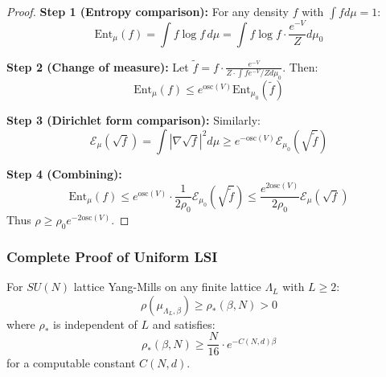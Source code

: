 \begin{proof}
\textbf{Step 1 (Entropy comparison):}
For any density $f$ with $\int f d\mu = 1$:
\begin{equation}
\mathrm{Ent}_\mu(f) = \int f \log f \, d\mu = \int f \log f \cdot \frac{e^{-V}}{Z} d\mu_0
\end{equation}

\textbf{Step 2 (Change of measure):}
Let $\tilde{f} = f \cdot \frac{e^{-V}}{Z \cdot \int f e^{-V}/Z d\mu_0}$. Then:
\begin{equation}
\mathrm{Ent}_\mu(f) \leq e^{\mathrm{osc}(V)} \mathrm{Ent}_{\mu_0}(\tilde{f})
\end{equation}

\textbf{Step 3 (Dirichlet form comparison):}
Similarly:
\begin{equation}
\mathcal{E}_\mu(\sqrt{f}) = \int |\nabla \sqrt{f}|^2 d\mu \geq e^{-\mathrm{osc}(V)} \mathcal{E}_{\mu_0}(\sqrt{\tilde{f}})
\end{equation}

\textbf{Step 4 (Combining):}
\begin{equation}
\mathrm{Ent}_\mu(f) \leq e^{\mathrm{osc}(V)} \cdot \frac{1}{2\rho_0} \mathcal{E}_{\mu_0}(\sqrt{\tilde{f}}) \leq \frac{e^{2\mathrm{osc}(V)}}{2\rho_0} \mathcal{E}_\mu(\sqrt{f})
\end{equation}
Thus $\rho \geq \rho_0 e^{-2\mathrm{osc}(V)}$.
\end{proof}

\subsubsection{Complete Proof of Uniform LSI}

\begin{theorem}
\label{thm:uniform_lsi_complete}
For $SU(N)$ lattice Yang-Mills on any finite lattice $\Lambda_L$ with $L \geq 2$:
\begin{equation}
\rho(\mu_{\Lambda_L, \beta}) \geq \rho_*(\beta, N) > 0
\end{equation}
where $\rho_*$ is independent of $L$ and satisfies:
\begin{equation}
\rho_*(\beta, N) \geq \frac{N}{16} \cdot e^{-C(N, d) \beta}
\end{equation}
for a computable constant $C(N, d)$.
\end{theorem}

